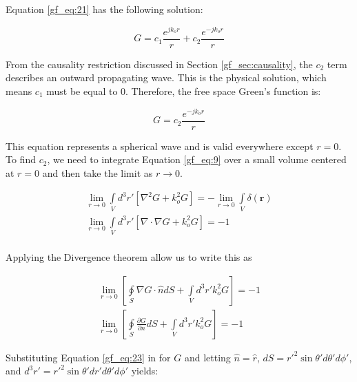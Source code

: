Equation \ref{gf_eq:21} has the following  solution:

\begin{equation}
G = c_1\frac{e^{jk_or}}{r} + c_2\frac{e^{-jk_or}}{r}
\label{gf_eq:22}
\end{equation}
\renewcommand{\baselinestretch}{2} \small\normalsize

From the causality restriction discussed in Section \ref{gf_sec:causality}, the $c_2$ term describes an outward propagating wave. This is the physical solution, which means $c_1$ must be equal to $0$. Therefore, the free space Green's function is:

\begin{equation}
G = c_2\frac{e^{-jk_or}}{r}
\label{gf_eq:23}
\end{equation}
\renewcommand{\baselinestretch}{2} \small\normalsize

This equation represents a spherical wave and is valid everywhere except $r=0$. To find $c_2$, we need to integrate Equation \ref{gf_eq:9} over a small volume centered at $r=0$ and then take the limit as $r\rightarrow0$.

\begin{equation}
\begin{gathered}
\lim_{r\to0}\int\limits_{V}d^3r'\left[\nabla^2G+ k_o^2G\right] = -\lim_{r\to0}\int\limits_{V}\delta\left(\mathbf{r}\right) \\
\lim_{r\to0}\int\limits_{V}d^3r'\left[\nabla \cdot\nabla G+ k_o^2G\right] = -1 \\
\end{gathered}
\label{gf_eq:24}
\end{equation}
\renewcommand{\baselinestretch}{2} \small\normalsize

\noindent Applying the Divergence theorem allow us to write this as

\begin{equation}
\begin{gathered}
\lim_{r\to0}\left[\oint\limits_{S}\nabla G \cdot \hat{n} dS + \int\limits_{V}d^3r' k_o^2G\right] = -1 \\
\lim_{r\to0}\left[\oint\limits_{S}\frac{\partial G}{\partial n} dS + \int\limits_{V}d^3r' k_o^2G\right] = -1
\end{gathered}
\label{gf_eq:24a}
\end{equation}
\renewcommand{\baselinestretch}{2} \small\normalsize

Substituting Equation \ref{gf_eq:23} in for $G$ and letting $\hat{n} = \hat{r}$, $dS = r'^2\sin{\theta'}d\theta' d\phi'$, and  $d^3r' = r'^2\sin{\theta'}dr'd\theta' d\phi'$ yields:

